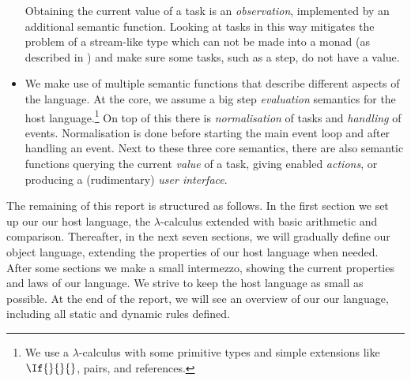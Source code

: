 \begin{itemize}
    Obtaining the current value of a task is an \emph{observation},
    implemented by an additional semantic function.
    Looking at tasks in this way mitigates the problem of a stream-like type which can not be made into a monad
    (as described in \textcite{theses/radboud/VinterHviid18})
    and make sure some tasks, such as a step, do not have a value.
  \item
    We make use of multiple semantic functions that describe different aspects of the language.
    At the core, we assume a big step \emph{evaluation} semantics for the host language.\footnote{
      We use a $\lambda$-calculus with some primitive types and simple extensions like $\If{}{}{}$, pairs, and references.}
    On top of this there is \emph{normalisation} of tasks
    and \emph{handling} of events.
    Normalisation is done before starting the main event loop
    and after handling an event.
    Next to these three core semantics,
    there are also semantic functions querying the current \emph{value} of a task,
    giving enabled \emph{actions},
    or producing a (rudimentary) \emph{user interface}.
\end{itemize}

The remaining of this report is structured as follows.
In the first section we set up our our host language,
the $\lambda$-calculus extended with basic arithmetic and comparison.
Thereafter, in the next seven sections, we will gradually define our object language,
extending the properties of our host language when needed.
After some sections we make a small intermezzo,
showing the current properties and laws of our language.
We strive to keep the host language as small as possible.
At the end of the report,
we will see an overview of our our language,
including all static and dynamic rules defined.
